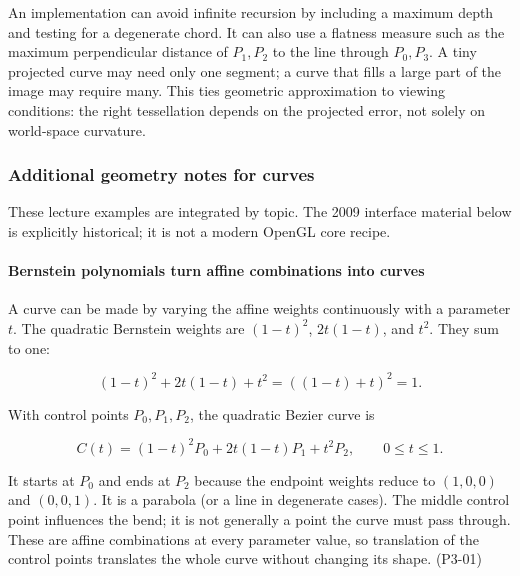 An implementation can avoid infinite recursion by including a maximum depth and testing for a degenerate chord. It can also use a flatness measure such as the maximum perpendicular distance of \(P_1,P_2\) to the line through \(P_0,P_3\). A tiny projected curve may need only one segment; a curve that fills a large part of the image may require many. This ties geometric approximation to viewing conditions: the right tessellation depends on the projected error, not solely on world-space curvature.

\subsubsection{Additional geometry notes for curves}\label{03-visual-computing-i-ch001-additional-geometry-notes-for-curves}

\hypertarget{03-visual-computing-i-ch001-additional-geometry-notes-for-curves}{}

These lecture examples are integrated by topic. The 2009 interface material below is explicitly historical; it is not a modern OpenGL core recipe.

\paragraph{Bernstein polynomials turn affine combinations into curves}\label{03-visual-computing-i-ch001-bernstein-polynomials-turn-affine-combinations-into-curves}

\hypertarget{03-visual-computing-i-ch001-bernstein-polynomials-turn-affine-combinations-into-curves}{}

A curve can be made by varying the affine weights continuously with a parameter \(t\). The quadratic Bernstein weights are \((1-t)^2\), \(2t(1-t)\), and \(t^2\). They sum to one:

\[
(1-t)^2+2t(1-t)+t^2=((1-t)+t)^2=1.
\]

With control points \(P_0,P_1,P_2\), the quadratic Bezier curve is

\[
C(t)=(1-t)^2P_0+2t(1-t)P_1+t^2P_2,\qquad 0\leq t\leq1.
\]

It starts at \(P_0\) and ends at \(P_2\) because the endpoint weights reduce to \((1,0,0)\) and \((0,0,1)\). It is a parabola (or a line in degenerate cases). The middle control point influences the bend; it is not generally a point the curve must pass through. These are affine combinations at every parameter value, so translation of the control points translates the whole curve without changing its shape. (P3-01)

